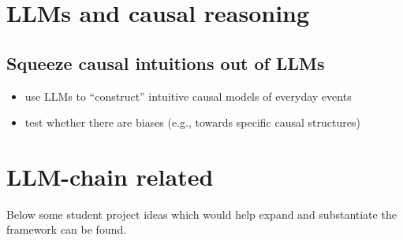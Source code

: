 \documentclass[fleqn,reqno,10pt]{article}
\begin{document}
\section{LLMs and causal reasoning}

\subsection{Squeeze causal intuitions out of LLMs}

\begin{itemize}
  \item use LLMs to ``construct'' intuitive causal models of everyday events
  \item test whether there are biases (e.g., towards specific causal structures)
\end{itemize}

\section{LLM-chain related}

Below some student project ideas which would help expand and substantiate the framework can be found.
\end{document}
